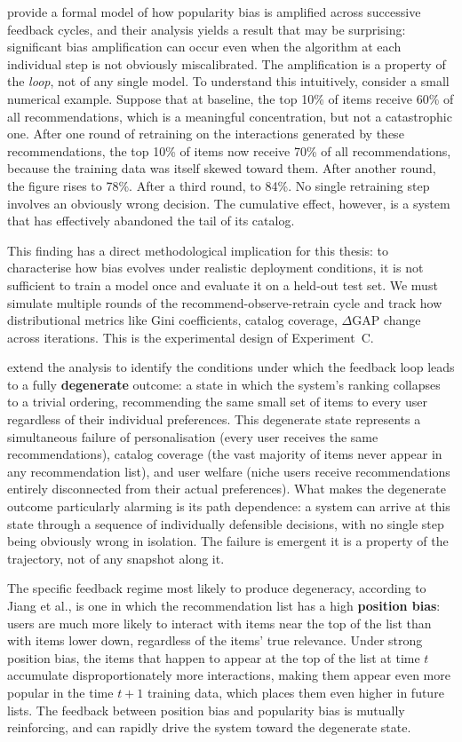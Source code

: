 \documentclass[11pt,a4paper]{report}
\begin{document}
\citet{mansoury2020feedback} provide a formal model of how popularity bias is amplified across successive feedback cycles, and their analysis yields a result that may be surprising: significant bias amplification can occur even when the algorithm at each individual step is not obviously miscalibrated. The amplification is a property of the \emph{loop}, not of any single model. To understand this intuitively, consider a small numerical example. Suppose that at baseline, the top 10\% of items receive 60\% of all recommendations, which is a meaningful concentration, but not a catastrophic one. After one round of retraining on the interactions generated by these recommendations, the top 10\% of items now receive 70\% of all recommendations, because the training data was itself skewed toward them. After another round, the figure rises to 78\%. After a third round, to 84\%. No single retraining step involves an obviously wrong decision. The cumulative effect, however, is a system that has effectively abandoned the tail of its catalog.

This finding has a direct methodological implication for this thesis: to characterise how bias evolves under realistic deployment conditions, it is not sufficient to train a model once and evaluate it on a held-out test set. We must simulate multiple rounds of the recommend-observe-retrain cycle and track how distributional metrics like Gini coefficients, catalog coverage, $\Delta$GAP change across iterations. This is the experimental design of Experiment~C.

\citet{jiang2019degenerate} extend the analysis to identify the conditions under which the feedback loop leads to a fully \textbf{degenerate} outcome: a state in which the system's ranking collapses to a trivial ordering, recommending the same small set of items to every user regardless of their individual preferences. This degenerate state represents a simultaneous failure of personalisation (every user receives the same recommendations), catalog coverage (the vast majority of items never appear in any recommendation list), and user welfare (niche users receive recommendations entirely disconnected from their actual preferences). What makes the degenerate outcome particularly alarming is its path dependence: a system can arrive at this state through a sequence of individually defensible decisions, with no single step being obviously wrong in isolation. The failure is emergent it is a property of the trajectory, not of any snapshot along it.

The specific feedback regime most likely to produce degeneracy, according to Jiang et al., is one in which the recommendation list has a high \textbf{position bias}: users are much more likely to interact with items near the top of the list than with items lower down, regardless of the items' true relevance. Under strong position bias, the items that happen to appear at the top of the list at time $t$ accumulate disproportionately more interactions, making them appear even more popular in the time $t+1$ training data, which places them even higher in future lists. The feedback between position bias and popularity bias is mutually reinforcing, and can rapidly drive the system toward the degenerate state.
\end{document}
